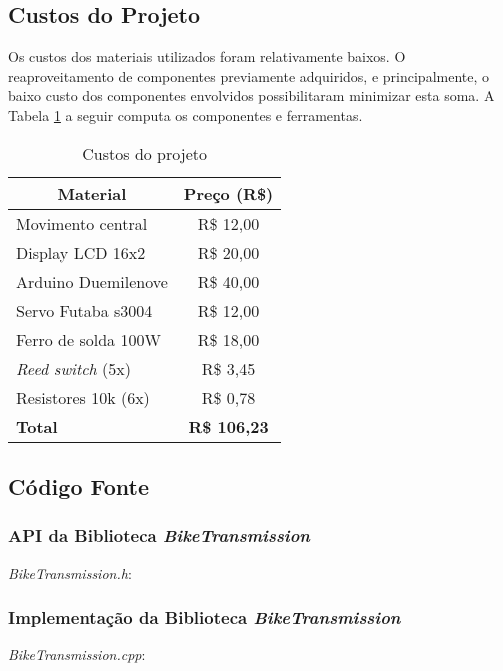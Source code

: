\documentclass[a4paper,11pt]{article}
\begin{document}
%

%
\subsection{Custos do Projeto}
\label{custos}
Os custos dos materiais utilizados foram relativamente baixos. O
reaproveitamento de componentes previamente adquiridos, e principalmente, o
baixo custo dos componentes envolvidos possibilitaram minimizar esta soma. A
Tabela \ref{tab:custos} a seguir computa os componentes e ferramentas.
{
\newcommand{\mc}[3]{\multicolumn{#1}{#2}{#3}}
\begin{table}[ht]
\begin{center}
\caption{Custos do projeto}
\label{tab:custos}
\begin{tabular}{lc}
\mc{1}{c}{\textbf{Material}} & \textbf{Preço (R\$)}\\\hline
Movimento central & R\$ 12,00\\
Display LCD 16x2 & R\$ 20,00\\
Arduino Duemilenove & R\$ 40,00\\
Servo Futaba s3004 & R\$ 12,00\\
Ferro de solda 100W & R\$ 18,00\\
\textit{Reed switch} (5x) & R\$ 3,45\\
Resistores 10k (6x) & R\$ 0,78\\\hline
\textbf{Total} & \textbf{R\$ 106,23}\\\hline
\end{tabular}
\end{center}
\end{table}
}



%
\subsection{Código Fonte}
\label{codigo}

\subsubsection{API da Biblioteca \textit{BikeTransmission}}
\label{code:api}
\textit{BikeTransmission.h}:


\subsubsection{Implementação da Biblioteca \textit{BikeTransmission}}
\label{code:impl}
\textit{BikeTransmission.cpp}:

\end{document}
